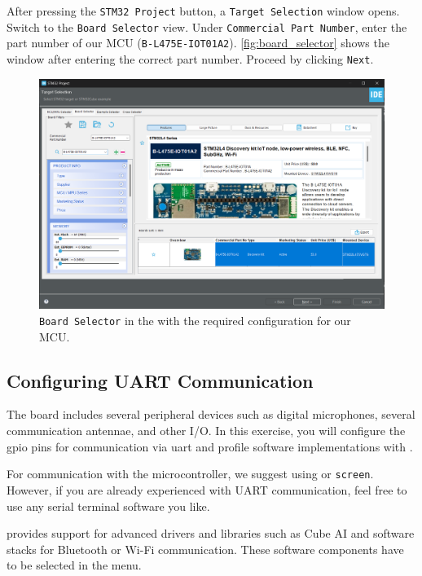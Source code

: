 \documentclass[parskip=half,notes,cadrem,toolver]{iisvlsi}
\begin{document}
After pressing the \texttt{STM32 Project} button, a \texttt{Target Selection} window opens. Switch to the \texttt{Board Selector} view. Under \texttt{Commercial Part Number}, enter the part number of our MCU (\texttt{B-L475E-IOT01A2}). \autoref{fig:board_selector} shows the window after entering the correct part number. Proceed by clicking \texttt{Next}.

\begin{figure}[H]
    \begin{center}
        \includegraphics[width=\linewidth]{new_figures/board_selector.png}
        \caption{\texttt{Board Selector} in the \stmcubeide with the required configuration for our MCU.}
        \label{fig:board_selector}
    \end{center}
\end{figure}

\subsection*{Configuring UART Communication}

The board includes several peripheral devices such as digital microphones, several communication antennae, and other I/O. In this exercise, you will configure the \gls{gpio} pins for communication via \gls{uart} and profile software implementations with \stmcubeide.

For communication with the microcontroller, we suggest using \term or \texttt{screen}. However, if you are already experienced with UART communication, feel free to use any serial terminal software you like.

\stmcube provides support for advanced drivers and libraries such as Cube AI and software stacks for Bluetooth or Wi-Fi communication. These software components have to be selected in the    menu.
\end{document}

